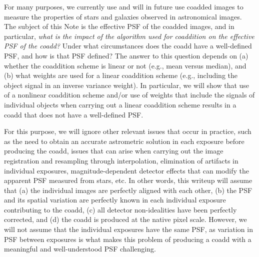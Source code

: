 \documentclass[modern]{style_and_logos/lsstdescnote}
\begin{document}
For many purposes, we currently use and will in future use coadded images to measure the properties of stars and galaxies observed in astronomical images.  The subject of this Note is the effective PSF of the coadded images, and in particular, {\em what is the impact of the algorithm used for coaddition on the effective PSF of the coadd?} Under what circumstances does the coadd have a well-defined PSF, and how is that PSF defined?  The answer to this question depends on (a) whether the coaddition scheme is linear or not (e.g., mean versus median), and (b) what weights are used for a linear coaddition scheme (e.g., including the object signal in an inverse variance weight). In particular, we will show that use of a nonlinear coaddition scheme and/or use of weights that include the signals of individual objects when carrying out a linear coaddition scheme results in a coadd that does not have a well-defined PSF.

For this purpose, we will ignore other relevant issues that occur in practice, such as the need to obtain an accurate astrometric solution in each exposure before producing the coadd, issues that can arise when carrying out the image registration and resampling through interpolation, elimination of artifacts in individual exposures, magnitude-dependent detector effects that can modify the apparent PSF measured from stars, etc.  In other words, this writeup will assume that (a) the individual images are perfectly aligned with each other, (b) the PSF and its spatial variation are perfectly known in each individual exposure contributing to the coadd, (c) all detector non-idealities have been perfectly corrected, and (d) the coadd is produced at the native pixel scale. 
However, we will not assume that the individual exposures have the same PSF, as variation in PSF between exposures is what makes this problem of producing a coadd with a meaningful and well-understood PSF challenging. 
\end{document}
